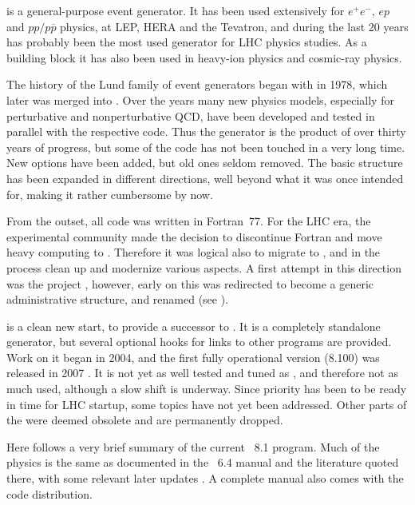 
\mcsubsection{\gensectionintro}

\pythia is a general-purpose event generator. It has been used 
extensively for $e^+e^-$, $ep$ and $pp/p\overline{p}$ physics, 
\eg at LEP, HERA and the Tevatron, and during the last 20 years 
has probably been the most used generator for LHC physics studies.
As a building block it has also been used in heavy-ion
physics and cosmic-ray physics.
 
The history of the Lund family of event generators began with 
\jetset \cite{Sjostrand:1982fn,Sjostrand:1982am,Sjostrand:1985ys,
Sjostrand:1986hx} in 1978, which later was merged into 
\pythia \cite{Bengtsson:1982jr,Bengtsson:1984yx,Bengtsson:1987kr,
Sjostrand:1993yb,Sjostrand:2000wi,Sjostrand:2006za}. Over the years 
many new physics models, especially for perturbative and 
nonperturbative QCD, have been developed and tested in parallel 
with the respective code. Thus the \pythiasix generator is the 
product of over thirty years of progress, but some of the code 
has not been touched in a very long time. New options have been 
added, but old ones seldom removed. The basic structure has been 
expanded in different directions, well beyond what it was once 
intended for, making it rather cumbersome by now.

{}From the outset, all code was written in Fortran~77. For the
LHC era, the experimental community made the decision to discontinue
Fortran and move heavy computing to \cpp. Therefore it was logical
also to migrate \pythia to \cpp, and in the process clean up and 
modernize various aspects. A first attempt in this direction was 
the \pythiaseven project \cite{Lonnblad:1998cq,Bertini:2000uh}, 
however, early on this was redirected to become a generic 
administrative structure, and renamed \thepeg (see ).

\pythiaeight is a clean new start, to provide a successor to \pythiasix. 
It is a completely standalone generator, but several optional hooks 
for links to other programs are provided. Work on it began in 2004, 
and the first fully operational version (8.100) was released in 2007 
\cite{Sjostrand:2007gs}. It is not yet as well tested and tuned as 
\pythiasix, and therefore not as much used, although a slow shift is 
underway. Since priority has been to be ready in time for LHC startup,
some topics have not yet been addressed. Other parts of the \pythiasix 
were deemed obsolete and are permanently dropped.

Here follows a very brief summary of the current \pythia~8.1 program.
Much of the physics is the same as documented in the \pythia~6.4 manual 
\cite{Sjostrand:2006za} and the literature quoted there, with some relevant 
later updates \cite{Corke:2009tk,Corke:2010zj,Navin:2010kk,
Kasemets:2010sg,Carloni:2010tw,Corke:2010yf}. 
A complete manual also comes with the code distribution.
 
